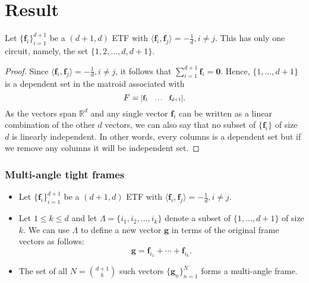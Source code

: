 \documentclass{beamer}
\newcommand{\RR}{\mathbb{R}}
\renewcommand{\vec}[1]{\mathbf{#1}}
\newcommand{\ivec}[2][.8]{%
  \scalebox{#1}{%
    \renewcommand{\arraystretch}{.8}%
    $\begin{bmatrix}#2\end{bmatrix}$%
  }
}
\begin{document}
 {
\usebackgroundtemplate{}
\section{Result}
\begin{frame}
   \begin{theorem}[K. Lin, J. Oldroyd 2023]
Let $\{\vec{f}_i\}_{i=1}^{d+1}$ be a $(d+1,d)$ ETF with $\langle\vec{f}_i,\vec{f}_j\rangle = -\frac{1}{d}, i\neq j$.
This has only one circuit, namely, the set $\{1, 2, \ldots, d, d+1\}$.
\end{theorem}
\begin{proof}
Since $\langle\vec{f}_i,\vec{f}_j\rangle = -\frac{1}{d}, i\neq j$, it follows that $\sum_{i=1}^{d+1}\vec{f}_i = \vec{0}$.
Hence, $\{1,\ldots, d+1\}$ is a dependent set in the matroid associated with
\[
    F = \ivec{\vec{f}_1 & \ldots & \vec{f}_{d+1}}.
\]
As the vectors span $\RR^d$ and any single vector $\vec{f}_i$ can be written as a linear combination of the other $d$ vectors, we can also say that no subset of $\{\vec{f}_i\}$ of size $d$ is linearly independent.
In other words, every columns is a dependent set but if we remove any columns it will be independent set.
\end{proof}
\end{frame}

\begin{frame}
    \frametitle{Multi-angle tight frames}
    \begin{itemize}
    \item <1-> Let $\{\vec{f}_i\}_{i=1}^{d+1}$ be a $(d+1,d)$ ETF with $\langle\vec{f}_i,\vec{f}_j\rangle = -\frac{1}{d}, i\neq j$.
    
    \item <2-> Let $1\leq k\leq d$ and let $\Lambda = \{i_1, i_2, \ldots, i_k\}$ denote a subset of $\{1,\ldots, d+1\}$ of size $k$.
    We can use $\Lambda$ to define a new vector $\vec{g}$ in terms of the original frame vectors as follows:
    \[
    \vec{g} = \vec{f}_{i_1} + \cdots + \vec{f}_{i_{k}}.
    \]

    \item <3-> The set of all $N = \binom{d+1}{k}$ such vectors $\{\vec{g}_n\}_{n=1}^{N}$ forms a multi-angle frame.\cite{datta2019low}
    \end{itemize}
\end{frame}

}
\end{document}
